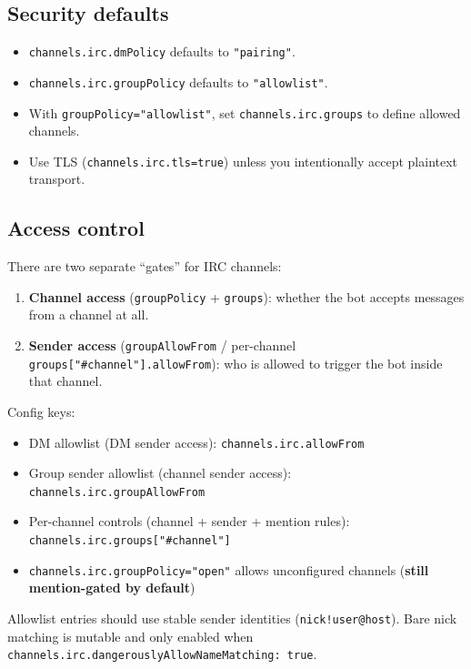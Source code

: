 \subsection{Security defaults}


\begin{itemize}
  \item \texttt{channels.irc.dmPolicy} defaults to \texttt{"pairing"}.
  \item \texttt{channels.irc.groupPolicy} defaults to \texttt{"allowlist"}.
  \item With \texttt{groupPolicy="allowlist"}, set \texttt{channels.irc.groups} to define allowed channels.
  \item Use TLS (\texttt{channels.irc.tls=true}) unless you intentionally accept plaintext transport.
\end{itemize}


\subsection{Access control}


There are two separate “gates” for IRC channels:

\begin{enumerate}
  \item \textbf{Channel access} (\texttt{groupPolicy} + \texttt{groups}): whether the bot accepts messages from a channel at all.
  \item \textbf{Sender access} (\texttt{groupAllowFrom} / per-channel \texttt{groups["\#channel"].allowFrom}): who is allowed to trigger the bot inside that channel.
\end{enumerate}


Config keys:

\begin{itemize}
  \item DM allowlist (DM sender access): \texttt{channels.irc.allowFrom}
  \item Group sender allowlist (channel sender access): \texttt{channels.irc.groupAllowFrom}
  \item Per-channel controls (channel + sender + mention rules): \texttt{channels.irc.groups["\#channel"]}
  \item \texttt{channels.irc.groupPolicy="open"} allows unconfigured channels (\textbf{still mention-gated by default})
\end{itemize}


Allowlist entries should use stable sender identities (\texttt{nick!user@host}).
Bare nick matching is mutable and only enabled when \texttt{channels.irc.dangerouslyAllowNameMatching: true}.

